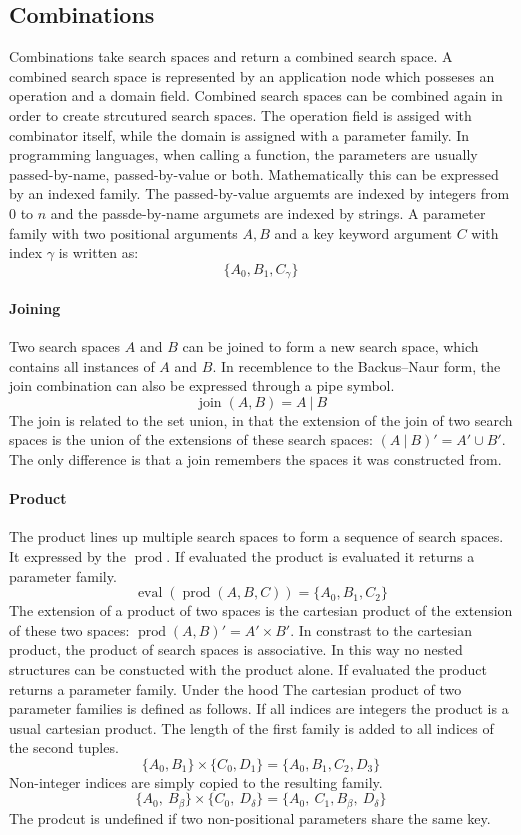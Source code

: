 \documentclass[english]{article}
\begin{document}
\subsection{Combinations}
Combinations take search spaces and return a combined search space. A combined search space is represented by an application node which posseses an operation and a domain field. Combined search spaces can be combined again in order to create strcutured search spaces. The operation field is assiged with combinator itself, while the domain is assigned with a parameter family.
In programming languages, when calling a function, the parameters are usually passed-by-name, passed-by-value or both. Mathematically this can be expressed by an indexed family. The passed-by-value arguemts are indexed by integers from $0$ to $n$ and the passde-by-name argumets are indexed by strings. A parameter family with two positional arguments $A,B$ and a key keyword argument $C$ with index $\gamma$ is written as:
$$\{A_0, B_1, C_\gamma\}$$

\paragraph{Joining}
Two search spaces $A$ and $B$ can be joined to form a new search space, which contains all instances of $A$ and $B$. In recemblence to the Backus–Naur form, the join combination can also be expressed through a pipe symbol.
$$ \operatorname{join}(A, B) = A\ |\ B $$
The join is related to the set union, in that the extension of the join of two search spaces is the union of the extensions of these search spaces: $(A\ |\ B)' = A' \cup B'$. The only difference is that a join remembers the spaces it was constructed from.

\paragraph{Product}
The product lines up multiple search spaces to form a sequence of search spaces. It expressed by the $\operatorname{prod}$. If evaluated the product is evaluated it returns a parameter family.
$$\operatorname{eval}(\operatorname{prod}(A, B, C)) = \{A_0, B_1, C_2\}$$
The extension of a product of two spaces is the cartesian product of the extension of these two spaces: $\operatorname{prod}(A,B)' = A' \times B'$. In constrast to the cartesian product, the product of search spaces is associative.  In this way no nested structures can be constucted with the product alone. If evaluated the product returns a parameter family. Under the hood
The cartesian product of two parameter families is defined as follows. If all indices are integers the product is a usual cartesian product. The length of the first family is added to all indices of the second tuples.
$$\{A_0, B_1\} \times \{C_0, D_1\} = \{A_0, B_1, C_2, D_3\}$$
Non-integer indices are simply copied to the resulting family.
$$\{A_0,\ B_\beta\} \times \{C_0,\ D_\delta\} = \{A_0,\ C_1, B_\beta,\ D_\delta\}$$
The prodcut is undefined if two non-positional parameters share the same key.
\end{document}
